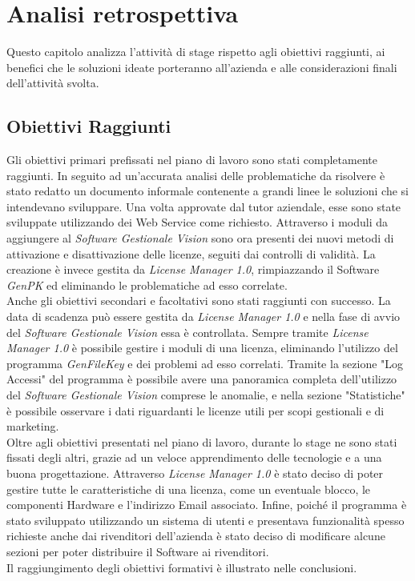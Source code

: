 
\chapter{Analisi retrospettiva}
\label{cap:analisi-retrospettiva}
Questo capitolo analizza l'attività di stage rispetto agli obiettivi raggiunti, ai benefici che le soluzioni ideate porteranno all'azienda e alle considerazioni finali dell'attività svolta.


\section{Obiettivi Raggiunti}

Gli obiettivi primari prefissati nel piano di lavoro sono stati completamente raggiunti. In seguito ad un'accurata analisi delle problematiche da risolvere è stato redatto un documento informale contenente a grandi linee le soluzioni che si intendevano sviluppare. Una volta approvate dal tutor aziendale, esse sono state sviluppate utilizzando dei Web Service come richiesto. Attraverso i moduli da aggiungere al \textit{Software Gestionale Vision} sono ora presenti dei nuovi metodi di attivazione e disattivazione delle licenze, seguiti dai controlli di validità. La creazione è invece gestita da \textit{License Manager 1.0}, rimpiazzando il Software \textit{GenPK} ed eliminando le problematiche ad esso correlate.
\\Anche gli obiettivi secondari e facoltativi sono stati raggiunti con successo. La data di scadenza può essere gestita da \textit{License Manager 1.0} e nella fase di avvio del \textit{Software Gestionale Vision} essa è controllata. Sempre tramite \textit{License Manager 1.0} è possibile gestire i moduli di una licenza, eliminando l'utilizzo del programma \textit{GenFileKey} e dei problemi ad esso correlati. Tramite la sezione "Log Accessi" del programma è possibile avere una panoramica completa dell'utilizzo del \textit{Software Gestionale Vision} comprese le anomalie, e nella sezione "Statistiche" è possibile osservare i dati riguardanti le licenze utili per scopi gestionali e di marketing.
\\Oltre agli obiettivi presentati nel piano di lavoro, durante lo stage ne sono stati fissati degli altri, grazie ad un veloce apprendimento delle tecnologie e a una buona progettazione. Attraverso \textit{License Manager 1.0} è stato deciso di poter gestire tutte le caratteristiche di una licenza, come un eventuale blocco, le componenti Hardware e l'indirizzo Email associato. Infine, poiché il programma è stato sviluppato utilizzando un sistema di utenti e presentava funzionalità spesso richieste anche dai rivenditori dell'azienda è stato deciso di modificare alcune sezioni per poter distribuire il Software ai rivenditori.
\\Il raggiungimento degli obiettivi formativi è illustrato nelle conclusioni.

